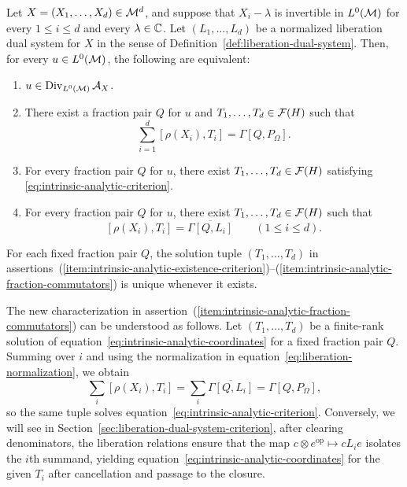 \begin{theorem}\label{thm:intrinsic-analytic}
Let $X=(X_1,\ldots,X_d)\in\mathcal M^d$, and suppose that $X_i-\lambda$ is invertible in $L^0(\mathcal M)$ for every $1\leq i\leq d$ and every $\lambda\in\mathbb C$.
Let $(L_1,\ldots,L_d)$ be a normalized liberation dual system for $X$ in the sense of Definition~\ref{def:liberation-dual-system}.
Then, for every $u\in L^0(\mathcal M)$, the following are equivalent:
\begin{enumerate}
\item $u\in\operatorname{Div}_{L^0(\mathcal M)}\mathcal A_X$.
\item\label{item:intrinsic-analytic-existence-criterion}  There exist a fraction pair $Q$ for $u$ and $T_1,\ldots,T_d\in\mathcal F(H)$ such that
\begin{equation}
 \sum_{i=1}^d[\rho(X_i),T_i]=\Gamma[Q,P_\Omega].
 \label{eq:intrinsic-analytic-criterion}
\end{equation}
\item\label{item:intrinsic-analytic-criterion} For every fraction pair $Q$ for $u$, there exist $T_1,\ldots,T_d\in\mathcal F(H)$ satisfying \eqref{eq:intrinsic-analytic-criterion}.
\item\label{item:intrinsic-analytic-fraction-commutators} For every fraction pair $Q$ for $u$, there exist $T_1,\ldots,T_d\in\mathcal F(H)$ such that
\begin{equation}\label{eq:intrinsic-analytic-coordinates}
 [\rho(X_i),T_i]=\overline{\Gamma[Q,L_i]}
 \qquad(1\leq i\leq d).
\end{equation}
\end{enumerate}
For each fixed fraction pair $Q$, the solution tuple $(T_1,\ldots,T_d)$ in assertions~\textup{(\ref{item:intrinsic-analytic-existence-criterion})}--\textup{(\ref{item:intrinsic-analytic-fraction-commutators})} is unique whenever it exists.
\end{theorem}

The new characterization in assertion~\textup{(\ref{item:intrinsic-analytic-fraction-commutators})} can be understood as follows.
Let $(T_1,\ldots,T_d)$ be a finite-rank solution of equation~\eqref{eq:intrinsic-analytic-coordinates} for a fixed fraction pair $Q$.
Summing over $i$ and using the normalization in equation~\eqref{eq:liberation-normalization}, we obtain
\[
 \sum_i[\rho(X_i),T_i]
 =\sum_i\overline{\Gamma[Q,L_i]}
 =\Gamma[Q,P_\Omega],
\]
so the same tuple solves equation~\eqref{eq:intrinsic-analytic-criterion}.
Conversely, we will see in Section~\ref{sec:liberation-dual-system-criterion}, after clearing denominators, the liberation relations ensure that the map $c\otimes e^{\mathrm{op}}\mapsto cL_i e$ isolates the $i$th summand, yielding equation~\eqref{eq:intrinsic-analytic-coordinates} for the given $T_i$ after cancellation and passage to the closure.

